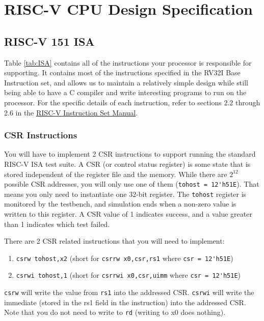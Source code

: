 \section{RISC-V CPU Design Specification} \label{sec:spec}
\subsection{RISC-V 151 ISA}
Table \ref{tab:ISA} contains all of the instructions your processor is responsible for supporting.
It contains most of the instructions specified in the RV32I Base Instruction set, and allows us to maintain a relatively simple design while still being able to have a C compiler and write interesting programs to run on the processor.
For the specific details of each instruction, refer to sections 2.2 through 2.6 in the \href{https://github.com/riscv/riscv-isa-manual/releases/download/Ratified-IMAFDQC/riscv-spec-20191213.pdf}{RISC-V Instruction Set Manual}.

\subsubsection{CSR Instructions}
You will have to implement 2 CSR instructions to support running the standard RISC-V ISA test suite.
A CSR (or control status register) is some state that is stored independent of the register file and the memory.
While there are $2^{12}$ possible CSR addresses, you will only use one of them (\verb|tohost = 12'h51E|).
That means you only need to instantiate one 32-bit register.
The \texttt{tohost} register is monitored by the testbench, and simulation ends when a non-zero value is written to this register.
A CSR value of 1 indicates success, and a value greater than 1 indicates which test failed.

There are 2 CSR related instructions that you will need to implement:
\begin{enumerate}
  \item \verb|csrw tohost,x2|  (short for \verb|csrrw x0,csr,rs1| where \verb|csr = 12'h51E|)
  \item \verb|csrwi tohost,1|  (short for \verb|csrrwi x0,csr,uimm| where \verb|csr = 12'h51E|)
\end{enumerate}

\verb|csrw| will write the value from \verb|rs1| into the addressed CSR.
\verb|csrwi| will write the immediate (stored in the rs1 field in the instruction) into the addressed CSR.
Note that you do not need to write to \verb|rd| (writing to x0 does nothing).

